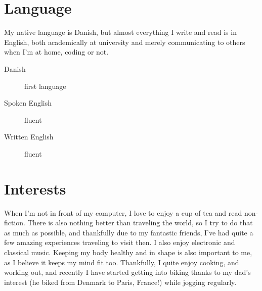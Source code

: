 \documentclass[margin,line]{resume}
\begin{document}
\begin{resume}
\section{\mysidestyle{} Language}
My native language is Danish, but almost everything I write and read is
in English, both academically at university and merely communicating to
others when I'm at home, coding or not.

\begin{description}
  \item[Danish] first language
  \item[Spoken English] fluent
  \item[Written English] fluent 
\end{description}

\section{\mysidestyle{} Interests}
When I'm not in front of my computer, I love to enjoy a cup of tea and read non-fiction. There is also nothing better than traveling the world, so I try to do that as much as possible, and thankfully due to my fantastic friends, I've had quite a few amazing experiences traveling to visit then. I also enjoy electronic and classical music. Keeping my body healthy and in shape is also important to me, as I believe it keeps my mind fit too. Thankfully, I quite enjoy cooking, and working out, and recently I have started getting into biking thanks to my dad's interest (he biked from Denmark to Paris, France!) while jogging regularly.
\end{resume}
\end{document}
